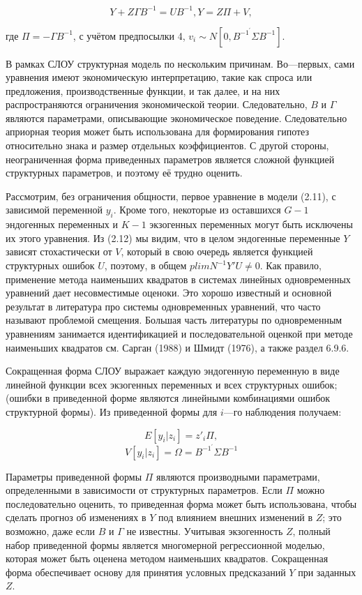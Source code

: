 \begin{equation}
Y+Z\Gamma B^{-1}=UB^{-1},
Y=Z\Pi+V,
\end{equation}

где $\Pi= -\Gamma B^{-1}$, с учётом предпосылки 4, $v_{i} \sim N[0,B^{-1^{'}} \Sigma B^{-1}]$.


	В рамках СЛОУ структурная модель  по нескольким причинам. Во---первых, сами уравнения имеют экономическую интерпретацию, такие как спроса или предложения, производственные функции, и так далее, и на них распространяются ограничения экономической теории. Следовательно, $B$ и $\Gamma$ являются параметрами, описывающие экономическое поведение. Следовательно априорная теория может быть использована для формирования гипотез относительно знака и размер отдельных коэффициентов. С другой стороны, неограниченная форма приведенных параметров является сложной функцией структурных параметров, и поэтому её трудно оценить.  

	
	Рассмотрим, без ограничения общности, первое уравнение в модели (2.11), с зависимой переменной $y_{i}$. Кроме того, некоторые из оставшихся $G-1$ эндогенных переменных и $K-1$ экзогенных переменных могут быть исключены их этого уравнения. Из (2.12) мы видим, что в целом эндогенные переменные $Y$ зависят стохастически от $V$, который в свою очередь является функцией структурных ошибок $U$, поэтому, в общем $plim N^{-1}Y'U\not=0$. Как правило, применение метода наименьших квадратов в системах линейных одновременных уравнений дает несовместимые оценоки. Это хорошо известный и основной результат в литература про системы одновременных уравнений, что часто называют проблемой смещения. Большая часть литературы по одновременным уравнениям занимается идентификацией и последовательной оценкой при методе наименьших квадратов см. Сарган (1988) и Шмидт (1976), а также раздел 6.9.6. 
	
	
	Сокращенная форма СЛОУ выражает каждую эндогенную переменную в виде линейной функции всех экзогенных переменных и всех структурных ошибок; (ошибки в приведенной форме являются линейными комбинациями ошибок структурной формы). Из приведенной формы для $i$---го наблюдения получаем:

\begin{equation}
E[y_{i}|z_{i}]=z'_{i}\Pi,
\end{equation}
\begin{equation}
V[y_{i}|z_{i}]=\Omega=B^{-1^{'}} \Sigma B^{-1}
\end{equation}
 
 
Параметры приведенной формы $\Pi$ являются производными параметрами, определенными в зависимости от структурных параметров. Если $\Pi$  можно последовательно оценить, то приведенная форма может быть использована, чтобы сделать прогноз об изменениях в $Y$ под влиянием внешних изменений в $Z$; это возможно, даже если $B$ и $\Gamma$ не известны. Учитывая экзогенность $Z$, полный набор приведенной формы является многомерной регрессионной моделью, которая может быть оценена методом наименьших квадратов. Сокращенная форма обеспечивает основу для принятия условных предсказаний $Y$ при заданных $Z$. 


